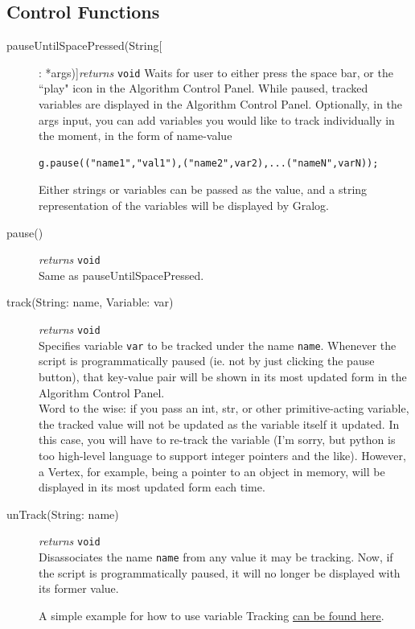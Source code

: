 \documentclass{article}
\newcounter{example}
\begin{document}
\subsection{Control Functions}
\begin{description}

\item[pauseUntilSpacePressed(String[]: *args)]\emph{returns}
  \texttt{void}
Waits for user to either press the space bar, or the ``play" icon in the Algorithm Control Panel. While paused, tracked variables are displayed in the Algorithm Control Panel. Optionally, in the args input, you can add variables you would like to track individually in the moment, in the form of name-value \begin{lstlisting}
g.pause(("name1","val1"),("name2",var2),...("nameN",varN));
\end{lstlisting}

Either strings or variables can be passed as the value, and a string representation of the variables will be displayed by Gralog.

\item[pause()]\emph{returns}
  \texttt{void}\\
Same as pauseUntilSpacePressed.

\item[track(String: name, Variable: var)]\emph{returns}
  \texttt{void}\\
Specifies variable \texttt{var} to be tracked under the name \texttt{name}. Whenever the script is programmatically paused (ie. not by just clicking the pause button), that key-value pair will be shown in its most updated form in the Algorithm Control Panel.\\

Word to the wise: if you pass an int, str, or other primitive-acting variable, the tracked value will not be updated as the variable itself it updated. In this case, you will have to re-track the variable (I'm sorry, but python is too high-level language to support integer pointers and the like). However, a Vertex, for example, being a pointer to an object in memory, will be displayed in its most updated form each time.


\item[unTrack(String: name)]\emph{returns}
  \texttt{void}\\
Disassociates the name \texttt{name} from any value it may be tracking. Now, if the script is programmatically paused, it will no longer be displayed with its former value.




A simple example for how to use variable Tracking \hyperref[varTrackingExample]{can be found here}.

\end{description}
\end{document}
